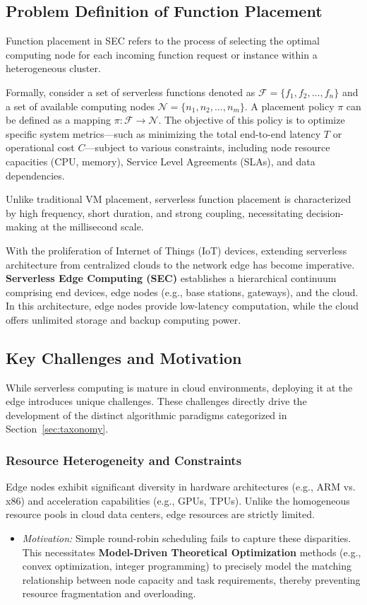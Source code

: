 \documentclass[lettersize,journal]{IEEEtran}
\begin{document}
\subsection{Problem Definition of Function Placement}
Function placement in SEC refers to the process of selecting the optimal computing node for each incoming function request or instance within a heterogeneous cluster.

Formally, consider a set of serverless functions denoted as $\mathcal{F} = \{f_1, f_2, \dots, f_n\}$ and a set of available computing nodes $\mathcal{N} = \{n_1, n_2, \dots, n_m\}$. A placement policy $\pi$ can be defined as a mapping $\pi: \mathcal{F} \rightarrow \mathcal{N}$. The objective of this policy is to optimize specific system metrics—such as minimizing the total end-to-end latency $T$ or operational cost $C$—subject to various constraints, including node resource capacities (CPU, memory), Service Level Agreements (SLAs), and data dependencies.

Unlike traditional VM placement, serverless function placement is characterized by high frequency, short duration, and strong coupling, necessitating decision-making at the millisecond scale.

With the proliferation of Internet of Things (IoT) devices, extending serverless architecture from centralized clouds to the network edge has become imperative. \textbf{Serverless Edge Computing (SEC)} establishes a hierarchical continuum comprising end devices, edge nodes (e.g., base stations, gateways), and the cloud. In this architecture, edge nodes provide low-latency computation, while the cloud offers unlimited storage and backup computing power.

\subsection{Key Challenges and Motivation}
While serverless computing is mature in cloud environments, deploying it at the edge introduces unique challenges. These challenges directly drive the development of the distinct algorithmic paradigms categorized in Section~\ref{sec:taxonomy}.

\subsubsection{Resource Heterogeneity and Constraints}
Edge nodes exhibit significant diversity in hardware architectures (e.g., ARM vs. x86) and acceleration capabilities (e.g., GPUs, TPUs). Unlike the homogeneous resource pools in cloud data centers, edge resources are strictly limited.
\begin{itemize}
    \item \textit{Motivation:} Simple round-robin scheduling fails to capture these disparities. This necessitates \textbf{Model-Driven Theoretical Optimization} methods (e.g., convex optimization, integer programming) to precisely model the matching relationship between node capacity and task requirements, thereby preventing resource fragmentation and overloading.
\end{itemize}
\end{document}
